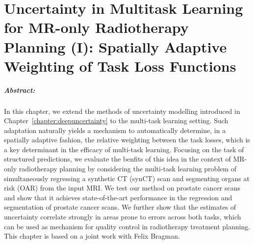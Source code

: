 
\chapter{Uncertainty in Multitask Learning for MR-only Radiotherapy Planning (I): Spatially Adaptive Weighting of Task Loss Functions} \label{chapter:multitaskuncertainty_part1}

\paragraph{Abstract:} In this chapter, we extend the methods of uncertainty modelling introduced in Chapter~\ref{chapter:deepuncertainty} to the multi-task learning setting. Such adaptation naturally yields a mechanism to automatically determine, in a spatially adaptive fashion, the relative weighting between the task losses, which is a key determinant in the efficacy of multi-task learning. Focusing on the task of structured predictions, we evaluate the benfits of this idea in the context of MR-only radiotherapy planning by considering the multi-task learning problem of simultaneously regressing a synthetic CT (synCT) scan and segmenting  organs at risk (OAR) from the input MRI. We test our method on prostate cancer scans and show that it achieves state-of-the-art performance in the regression and segmentation of prostate cancer scans. We further show that the estimates of uncertainty correlate strongly in areas prone to errors across both tasks, which can be used as mechanism for quality control in radiotherapy treatment planning. This chapter is based on a joint work \cite{bragman2018uncertainty} with Felix Bragman.

